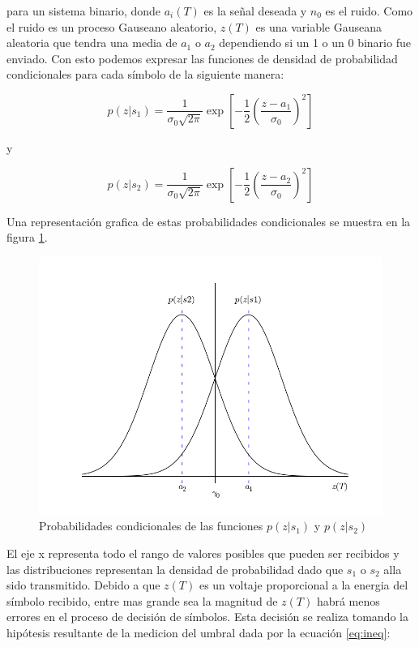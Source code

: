 para un sistema binario, donde $a_i(T)$ es la se\~nal deseada y $n_0$ es el ruido. Como el ruido es
un proceso Gauseano aleatorio, $z(T)$ es una variable Gauseana aleatoria que tendra una media de
$a_1$ o $a_2$ dependiendo si un 1 o un 0 binario fue enviado. Con esto podemos expresar las
funciones de densidad de probabilidad condicionales para cada s\'imbolo de la siguiente manera:

\begin{equation}
p(z|s_1)=\frac{1}{\sigma_0
\sqrt{2\pi}}\exp{\left[-\frac{1}{2}\left(\frac{z-a_1}{\sigma_0}\right)^2 \right]}
\end{equation}

y

\begin{equation}
p(z|s_2)=\frac{1}{\sigma_0
\sqrt{2\pi}}\exp{\left[-\frac{1}{2}\left(\frac{z-a_2}{\sigma_0}\right)^2 \right]}
\end{equation}

Una representaci\'on grafica de estas probabilidades condicionales se muestra en la figura
\ref{fig:condpdf}.

\begin{figure}[htp]
\centering
	\includegraphics[width=5.5in]{figs/condpdf}
	\caption{Probabilidades condicionales de las funciones $p(z|s_1)$ y $p(z|s_2)$}
	\label{fig:condpdf}
\end{figure}

El eje x representa todo el rango de valores posibles que pueden ser recibidos y las distribuciones
representan la densidad de probabilidad dado que $s_1$ o $s_2$ alla sido transmitido. Debido a que
$z(T)$ es un voltaje proporcional a la energia del s\'imbolo recibido, entre mas grande sea la
magnitud de $z(T)$ habr\'a menos errores en el proceso de decisi\'on de s\'imbolos. Esta decisi\'on
se realiza tomando la hip\'otesis resultante de la medicion del umbral dada por la ecuaci\'on
\ref{eq:ineq}\cite{sklar}:

